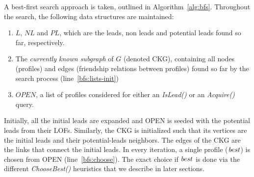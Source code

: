 \documentclass[prodmode,acmtecs]{acmsmall} %
\newcommand{\note}[2]{\textbf{\textsc{#1} says: \textit{#2}}}
\newcommand{\islead}[1]{{\em IsLead(#1)}}
\newcommand{\acquire}[1]{{\em Acquire(#1)}}
\newcommand{\best}{{\textit best}}
\begin{document}
A best-first search approach is taken, outlined in Algorithm~\ref{alg:bfs}. Throughout the search, the following data structures are maintained:
\begin{enumerate}
	\item $L$, $NL$ and $PL$, which are the leads, non leads and potential leads found so far, respectively.
	\item The {\em currently known subgraph} of $G$ (denoted CKG), containing all nodes (profiles) and edges (friendship relations between profiles) found so far by the search process (line~\ref{bfs:lists-init})
	\item $OPEN$, a list of profiles considered for either an \islead{} or an \acquire{} query. 
\end{enumerate}

% 

Initially, all the initial leads are expanded and OPEN is seeded with the potential leads from their LOFs. Similarly, the CKG is initialized such that its vertices are the initial leads and their potential-leads neighbors. The edges of the CKG are the links that connect the initial leads. In every iteration, a single profile ($\best$) is chosen from OPEN (line~\ref{bfs:choose}). The exact choice if $\best$ is done via the different {\em ChooseBest()} heuristics that we describe in later sections.
\end{document}
